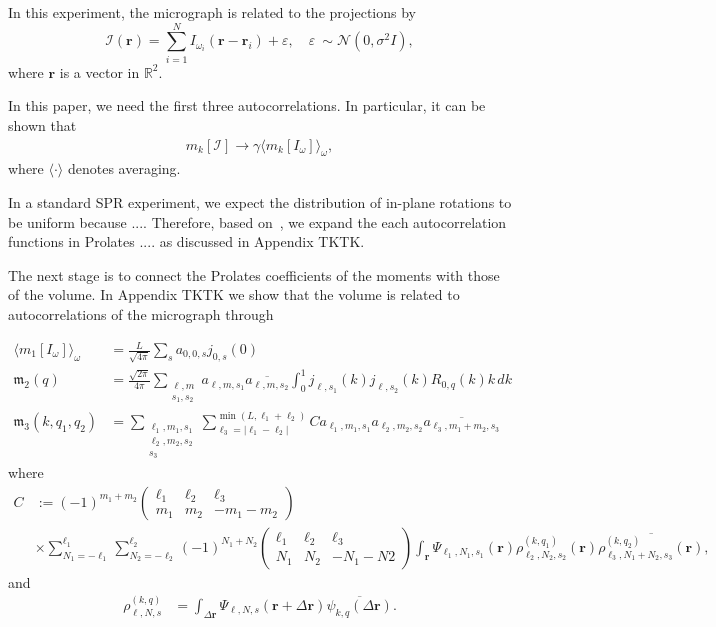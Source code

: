 \documentclass[english,11pt]{article}
\newcommand{\1}{\mathbf{1}}
\newcommand{\rr}{\textbf{r}}
\newcommand{\II}{\mathcal{I}}
\newcommand{\TODO}[1]{{\color{red}{[#1]}}}
\numberwithin{equation}{section}
\theoremstyle{plain}
\theoremstyle{definition}
\theoremstyle{remark}
\theoremstyle{plain}
\theoremstyle{remark}
\theoremstyle{plain}
\theoremstyle{plain}
\begin{document}
In this experiment, the micrograph is related to the projections by 
\begin{equation}
\mathcal{I}(\rr) = \sum_{i=1}^{N} I_{\omega_i}(\rr-\rr_i)+ \varepsilon, \quad \varepsilon~\sim\mathcal{N}(0,\sigma^2 I),
\end{equation}
where $\rr$ is a vector in $\mathbb{R}^2$. \TODO{To write down the definition of projection}

In this paper, we need the first three autocorrelations. In particular, it can be shown that 
\begin{align}
m_k[\II]  \to \gamma\langle m_k[I_\omega]\rangle_{\omega}, 
\end{align}
where $\langle\cdot\rangle$ denotes averaging. \TODO{Do we want to define a general moment?}

In a standard SPR experiment, we expect the distribution of in-plane rotations to be uniform because .... 
Therefore, based on~\cite{landa2017steerable}, we expand the each autocorrelation functions in Prolates .... as discussed in Appendix TKTK.

The next stage is to connect the Prolates coefficients of the moments with those of the volume.
In Appendix TKTK we show that the volume is related to autocorrelations of the micrograph through 

\begin{align}
\langle m_1[I_\omega]\rangle_\omega  &= \frac{L}{\sqrt{4\pi}}\sum_sa_{0,0,s}j_{0,s}(0) \\ 
\mathfrak{m}_2(q) &= \frac{\sqrt{2\pi}}{4\pi}\sum_{\substack{\ell,m\\s_1,s_2}}a_{\ell,m,s_1}\overline{a_{\ell,m,s_2}}
\int_0^1j_{\ell,s_1}(k)j_{\ell,s_2}(k)R_{0,q}(k)k\, dk \\
\mathfrak{m}_3(k,q_1,q_2) &= \sum_{\substack{\ell_1,m_1,s_1\\\ell_2,m_2,s_2\\s_3}}\sum_{\ell_3=|\ell_1-\ell_2|}^{\min(L,\ell_1+\ell_2)}C a_{\ell_1,m_1,s_1}a_{\ell_2,m_2,s_2}\overline{a_{\ell_3,m_1+m_2,s_3}}
\end{align}
where
\begin{align*}
C&:= (-1)^{m_1+m_2}\left(\begin{array}{ccc}\ell_1 & \ell_2  & \ell_3\\ m_1 & m_2 & -m_1-m_2\end{array}\right)\\
&\times \sum_{N_1=-\ell_1}^{\ell_1}\sum_{N_2=-\ell_2}^{\ell_2}(-1)^{N_1+N_2}\left(\begin{array}{ccc}\ell_1 & \ell_2  & \ell_3\\ N_1 & N_2 & -N_1-N2\end{array}\right)\int_{\rr}\Psi_{\ell_1,N_1,s_1}(\rr)\rho_{\ell_2,N_2,s_2}^{(k,q_1)}(\rr)\overline{\rho_{\ell_3,N_1+N_2,s_3}^{(k,q_2)}(\rr)},
\end{align*}
and 
\begin{align*}
\rho_{\ell,N,s}^{(k,q)}&=\int_{\Delta\rr}\Psi_{\ell,N,s}(\rr+\Delta\rr)\overline{\psi_{k,q}(\Delta\rr)}.
\end{align*}
\end{document}
